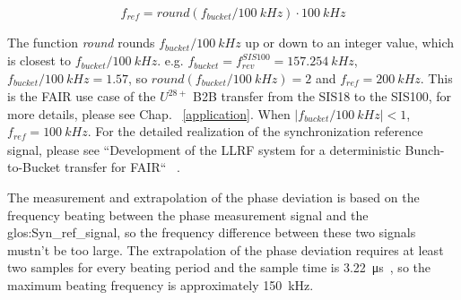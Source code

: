\begin{equation}
\label{round}
	f_\mathit{ref}=\textit{round} (f_{\mathit{bucket}}/\SI{100}{kHz})\cdot \SI{100}{kHz}
\end{equation}

The function \textit{round} rounds $f_{\mathit{bucket}}/\SI{100}{kHz}$ up or down to an integer value, which is closest to $f_{\mathit{bucket}}/\SI{100}{kHz}$. e.g. $f_{\mathit{bucket}}=f_\mathit{rev}^{SIS100}=\SI{157.254}{kHz}$, $f_{\mathit{bucket}}/\SI{100}{kHz}=1.57$, so $\textit{round} (f_{\mathit{bucket}}/\SI{100}{kHz})=2$ and $f_\mathit{ref}=\SI{200}{kHz}$. This is the FAIR use case of the $U^{28+}$ B2B transfer from the SIS18 to the SIS100, for more details, please see Chap. ~\ref{application}. When $|f_{\mathit{bucket}}/\SI{100}{kHz}|<1$, $f_\mathit{ref}=\SI{100}{kHz}$.  For the detailed realization of the synchronization reference signal, please see ``Development of the LLRF system for a deterministic Bunch-to-Bucket transfer for FAIR`` ~\cite{ferrand_development_????}.

The measurement and extrapolation of the phase deviation is based on the frequency beating between the phase measurement signal and the \gls{glos:Syn_ref_signal}, so the frequency difference between these two signals mustn't be too large. The extrapolation of the phase deviation requires at least two samples for every beating period and the sample time is \SI{3.22}{\us}~\cite{ferrand_development_????}, so the maximum beating frequency is approximately \SI{150}{kHz}. 

 
%
